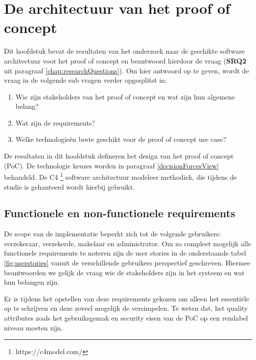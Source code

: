 \chapter{De architectuur van het proof of concept}\label{chap: currentState}
Dit hoofdstuk bevat de resultaten van het onderzoek naar de geschikte software architectuur voor het proof of concept en beantwoord hierdoor de vraag \researchQuestionTwo (\textbf{SRQ2} uit paragraaf \ref{chap:researchQuestions}). Om hier antwoord op te geven, wordt de vraag in de volgende sub vragen verder opgesplitst in: 
\begin{enumerate}
	\item Wie zijn stakeholders van het proof of concept en wat zijn hun algemene belang?
	\item Wat zijn de requirements?
	\item Welke technologieën beste geschikt voor de proof of concept use case?
\end{enumerate}

De resultaten in dit hoofdstuk defineren het design van het proof of concept (PoC). De technologie keuzes worden in paragraaf \ref{decisionForcesView} behandeld. De C4 \footnote{https://c4model.com/} software architectuur modeleer methodiek, die tijdens de studie is gehanteerd wordt hierbij gebruikt.

\newpage

\section{Functionele en non-functionele requirements}\label{requirements}
De scope van de implementatie beperkt zich tot de volgende gebruikers: verzekeraar, verzekerde, makelaar en administrator. Om zo compleet mogelijk alle functionele requirements te noteren zijn de user stories in de onderstaande tabel \ref{fig:userstories} vanuit de verschillende gebruikers perspectief geschreven. Hiermee beantwoorden we gelijk de vraag wie de stakeholders zijn in het systeem en wat hun belangen zijn.\par

Er is tijdens het opstellen van deze requirements gekozen om alleen het essentiële op te schrijven en deze zoveel mogelijk de versimpelen. Te weten dat, het quality attributes zoals het gebruiksgemak en security eisen van de PoC op een rendabel niveau moeten zijn.

